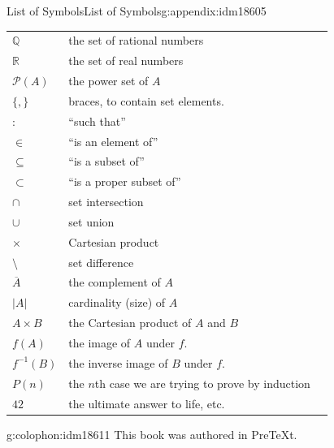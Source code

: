 \documentclass[oneside,10pt,]{book}
\numberwithin{equation}{chapter}
\def\Q{\mathbb Q}
\def\R{\mathbb R}
\def\pow{\mathcal P}
\def\inv{^{-1}}
\def\st{:}
\newcommand{\card}[1]{\left| #1 \right|}
\begin{document}
\begin{appendixptx}{List of Symbols}{}{List of Symbols}{}{}{g:appendix:idm18605}
\begin{longtable}[l]{lp{}r}
\(\Q\)&the set of rational numbers&\pageref{g:notation:idm13044}\\
\(\R\)&the set of real numbers&\pageref{g:notation:idm13055}\\
\(\pow(A)\)&the power set of \(A\)&\pageref{g:notation:idm13067}\\
\(\{, \}\)&braces, to contain set elements.&\pageref{g:notation:idm13081}\\
\(\st\)&``such that''&\pageref{g:notation:idm13092}\\
\(\in\)&``is an element of''&\pageref{g:notation:idm13103}\\
\(\subseteq\)&``is a subset of''&\pageref{g:notation:idm13124}\\
\( \subset\)&``is a proper subset of''&\pageref{g:notation:idm13139}\\
\(\cap\)&set intersection&\pageref{g:notation:idm13153}\\
\(\cup\)&set union&\pageref{g:notation:idm13168}\\
\(\times\)&Cartesian product&\pageref{g:notation:idm13184}\\
\(\setminus\)&set difference&\pageref{g:notation:idm13197}\\
\(\overline{A}\)&the complement of \(A\)&\pageref{g:notation:idm13207}\\
\(\card{A}\)&cardinality (size) of \(A\)&\pageref{g:notation:idm13218}\\
\(A\times B\)&the Cartesian product of \(A\) and \(B\)&\pageref{g:notation:idm13600}\\
\(f(A)\)&the image of \(A\) under \(f\).&\pageref{g:notation:idm14385}\\
\(f\inv(B)\)&the inverse image of \(B\) under \(f\).&\pageref{g:notation:idm14400}\\
\(P(n)\)&the \(n\)th case we are trying to prove by induction&\pageref{g:notation:idm17372}\\
\(42\)&the ultimate answer to life, etc.&\pageref{g:notation:idm17409}\\
\end{longtable}
\end{appendixptx}
%
\backmatter
%
%
\renewcommand{\leftmark}{Index}
\printindex
%
\cleardoublepage
\pagestyle{empty}
\begin{backcolophon}{g:colophon:idm18611}%
This book was authored in PreTeXt.%
\end{backcolophon}%
\end{document}
